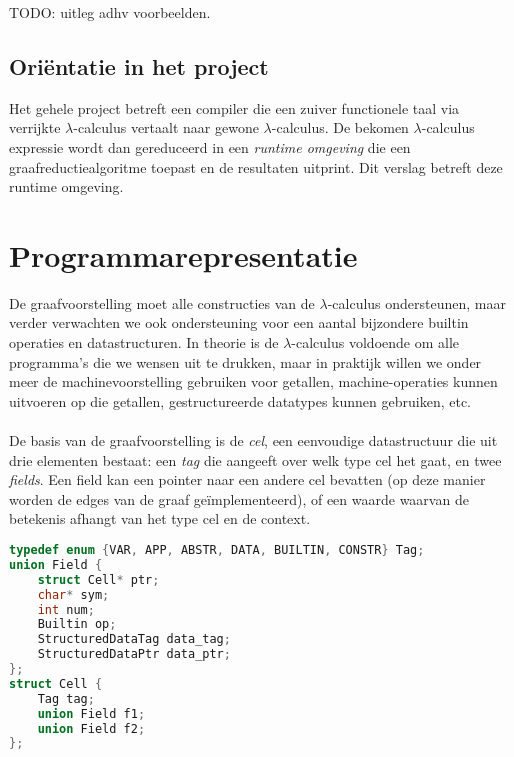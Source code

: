 \documentclass[a4paper,10pt]{article}
\begin{document}
TODO: uitleg adhv voorbeelden.

\subsection{Ori{\"e}ntatie in het project}
Het gehele project betreft een compiler die een zuiver functionele taal via verrijkte $\lambda$-calculus vertaalt naar gewone $\lambda$-calculus.
De bekomen $\lambda$-calculus expressie wordt dan gereduceerd in een \emph{runtime omgeving} die een graafreductiealgoritme toepast en de resultaten uitprint.
Dit verslag betreft deze runtime omgeving.

\section{Programmarepresentatie}
De graafvoorstelling moet alle constructies van de $\lambda$-calculus ondersteunen, maar verder verwachten we ook ondersteuning voor een aantal bijzondere builtin operaties en datastructuren.
In theorie is de $\lambda$-calculus voldoende om alle programma's die we wensen uit te drukken, maar in praktijk willen we onder meer de machinevoorstelling gebruiken voor getallen, machine-operaties kunnen uitvoeren op die getallen, gestructureerde datatypes kunnen gebruiken, etc.
\paragraph{}
De basis van de graafvoorstelling is de \emph{cel}, een eenvoudige datastructuur die uit drie elementen bestaat: een \emph{tag} die aangeeft over welk type cel het gaat, en twee \emph{fields}.
Een field kan een pointer naar een andere cel bevatten (op deze manier worden de edges van de graaf ge{\"i}mplementeerd), of een waarde waarvan de betekenis afhangt van het type cel en de context.

\begin{lstlisting}[language=C,frame=single,caption={Definitie van de Cell datastructuur}]
typedef enum {VAR, APP, ABSTR, DATA, BUILTIN, CONSTR} Tag;
union Field {
	struct Cell* ptr;
	char* sym;
	int num;
	Builtin op;
	StructuredDataTag data_tag;
	StructuredDataPtr data_ptr;
};
struct Cell {
	Tag tag;
	union Field f1;
	union Field f2;
};
\end{lstlisting}
\end{document}
